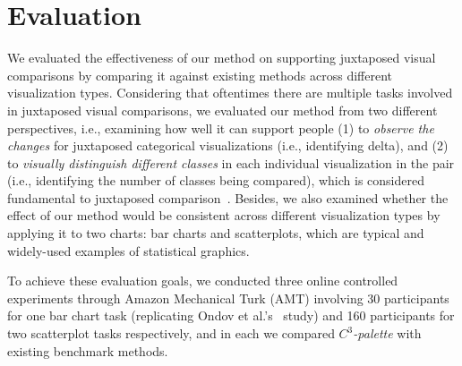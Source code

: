 \section {Evaluation}
\label{sec:results}

We evaluated the effectiveness of our method on supporting juxtaposed visual comparisons by comparing it against existing methods across different visualization types.
Considering that oftentimes there are multiple tasks involved in juxtaposed visual comparisons, we evaluated our method from two different perspectives, i.e., examining how well it can support people  (1) to \emph{observe the changes} for juxtaposed categorical visualizations (i.e., identifying delta), and (2) to \emph{visually distinguish different classes} in each individual visualization in the pair (i.e., identifying the number of classes being compared), which is considered fundamental to juxtaposed comparison~\cite{Gleicher18}.
Besides, we also examined whether the effect of our method would be consistent across different visualization types by applying it to two charts: bar charts and scatterplots, which are typical and widely-used examples of statistical graphics.

To achieve these evaluation goals, we conducted three online controlled experiments through Amazon Mechanical Turk (AMT) involving 30 participants for one bar chart task (replicating Ondov et al.'s~\cite{Ondov19} study) and 160 participants for two scatterplot tasks respectively, and in each we compared \emph{$C^3$-palette} with existing benchmark methods.



